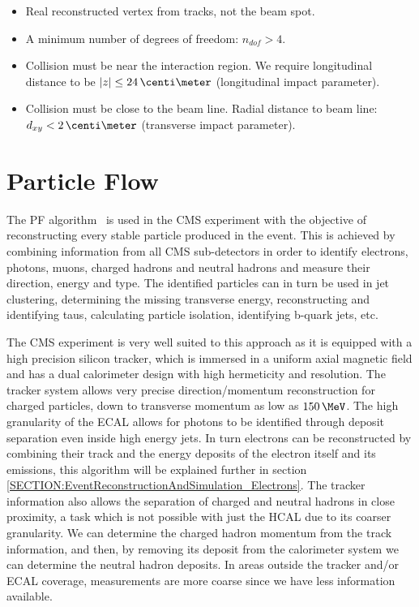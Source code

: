 \begin{itemize}
  \item Real reconstructed vertex from tracks, not the beam spot.
  \item A minimum number of degrees of freedom: $n_{dof}>4$.
  \item Collision must be near the interaction region. We require longitudinal distance to be $|z| \leq 24\,\centi\meter$ (longitudinal impact parameter).
  \item Collision must be close to the beam line. Radial distance to beam line: $d_{xy}<2\,\centi\meter$ (transverse impact parameter). 
\end{itemize}

\section{Particle Flow}
\label{SECTION:EventReconstructionAndSimulation_ParticleFlow}


The \gls{PF} algorithm~\cite{ARTICLE:CMSComissioningOfParticleFlow, ARTICLE:CMSParticleFlowEventRecontruction, ARTICLE:CMSComissioningOfParticleFlowWithMinBias} is used in the \gls{CMS} experiment with the objective of reconstructing every stable particle produced in the event. This is achieved by combining information from all \gls{CMS} sub-detectors in order to identify electrons, photons, muons, charged hadrons and neutral hadrons and measure their direction, energy and type. The identified particles can in turn be used in jet clustering, determining the missing transverse energy, reconstructing and identifying taus, calculating particle isolation, identifying b-quark jets, etc.

The \gls{CMS} experiment is very well suited to this approach as it is equipped with a high precision silicon tracker, which is immersed in a uniform axial magnetic field and has a dual calorimeter design with high hermeticity and resolution. The tracker system allows very precise direction/momentum reconstruction for charged particles, down to transverse momentum as low as $150\,\MeV$. The high granularity of the \gls{ECAL} allows for photons to be identified through deposit separation even inside high energy jets. In turn electrons can be reconstructed by combining their track and the energy deposits of the electron itself and its emissions, this algorithm will be explained further in section \ref{SECTION:EventReconstructionAndSimulation_Electrons}. The tracker information also allows the separation of charged and neutral hadrons in close proximity, a task which is not possible with just the \gls{HCAL} due to its coarser granularity. We can determine the charged hadron momentum from the track information, and then, by removing its deposit from the calorimeter system we can determine the neutral hadron deposits. In areas outside the tracker and/or \gls{ECAL} coverage, measurements are more coarse since we have less information available.

